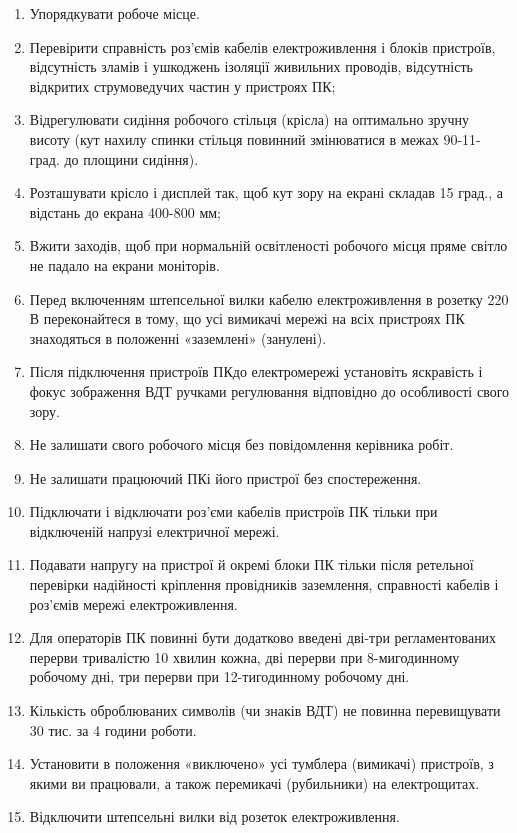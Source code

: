 \begin{enumerate}
 \item Упорядкувати робоче місце. 
 \item Перевірити  справність роз’ємів кабелів електроживлення і блоків пристроїв, відсутність зламів і ушкоджень ізоляції живильних проводів, відсутність відкритих струмоведучих частин у пристроях ПК;
 \item Відрегулювати сидіння робочого стільця (крісла) на оптимально зручну висоту      (кут нахилу спинки стільця повинний змінюватися в межах 90-11-град. до площини сидіння).
 \item Розташувати крісло і дисплей так, щоб кут зору на екрані складав 15 град., а відстань до екрана 400-800 мм;
 \item Вжити заходів, щоб при нормальній освітленості робочого місця пряме світло не падало на екрани моніторів.
 \item Перед включенням штепсельної вилки кабелю електроживлення в розетку 220 В переконайтеся в тому, що усі вимикачі мережі на всіх пристроях ПК знаходяться в положенні «заземлені» (занулені).
 \item Після підключення пристроїв ПКдо електромережі установіть яскравість і фокус зображення ВДТ ручками регулювання відповідно до особливості свого зору.
 \item Не залишати свого робочого місця без повідомлення керівника робіт.
 \item Не залишати працюючий ПКі його пристрої без спостереження.
 \item Підключати і відключати роз’єми кабелів пристроїв ПК тільки при відключеній напрузі електричної мережі.
 \item Подавати напругу на пристрої й окремі блоки ПК тільки після ретельної перевірки надійності кріплення провідників заземлення, справності кабелів і роз’ємів мережі електроживлення.
 \item Для операторів ПК повинні бути додатково введені дві-три регламентованих перерви тривалістю 10 хвилин кожна, дві перерви при 8-мигодинному робочому дні, три перерви при 12-тигодинному робочому дні. 
 \item Кількість оброблюваних символів (чи знаків ВДТ) не повинна перевищувати 30 тис. за 4 години роботи.
 \item Установити в положення «виключено» усі тумблера (вимикачі) пристроїв, з якими ви працювали, а також перемикачі (рубильники) на електрощитах.
 \item Відключити штепсельні вилки від розеток електроживлення.

\end{enumerate}
